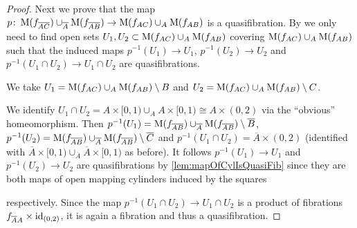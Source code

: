 \begin{prop}
\begin{proof}
        Next we prove that the map $p\colon\operatorname{M}(f_{\overline{A}\overline{C}})\cup_{\overline{A}}\operatorname{M}(f_{\overline{A}\overline{B}})\to\operatorname{M}(f_{AC})\cup_A\operatorname{M}(f_{AB})$ is a quasifibration.
        By \cite[Lemma 4K.3]{hatcher2002algebraic} we only need to find open sets $U_1,U_2\subset\operatorname{M}(f_{AC})\cup_A\operatorname{M}(f_{AB})$ covering $\operatorname{M}(f_{AC})\cup_A\operatorname{M}(f_{AB})$ such that the induced maps $p^{-1}(U_1)\to U_1$, $p^{-1}(U_2)\to U_2$ and $p^{-1}(U_1\cap U_2)\to U_1\cap U_2$ are quasifibrations.

        We take $U_1=\operatorname{M}(f_{AC})\cup_A\operatorname{M}(f_{AB})\setminus{B}$ and $U_2=\operatorname{M}(f_{AC})\cup_A\operatorname{M}(f_{AB})\setminus{C}$. 

        We identify $U_1\cap U_2=A\times [0,1)\cup_A A\times[0,1)\cong A\times (0,2)$ via the ``obvious'' homeomorphism. %
        Then $p^{-1}(U_1)=\operatorname{M}(f_{\overline{A}\overline{B}})\cup_{\overline{A}}\operatorname{M}(f_{\overline{A}\overline{B}})\setminus{\overline{B}}$, $p^{-1}(U_2)=\operatorname{M}(f_{\overline{A}\overline{B}})\cup_{\overline{A}}\operatorname{M}(f_{\overline{A}\overline{B}})\setminus{\overline{C}}$ and $p^{-1}(U_1\cap U_2)=\overline{A}\times (0,2)$ (identified with $\overline{A}\times [0,1)\cup_{\overline{A}} \overline{A}\times[0,1)$ as before).
        It follows $p^{-1}(U_1)\to U_1$ and $p^{-1}(U_2)\to U_2$ are quasifibrations by \cref{lem:mapOfCylIsQuasiFib} since they are both maps of open mapping cylinders induced by the squares 
        \begin{center}
        \end{center}
        respectively.
        Since the map $p^{-1}(U_1\cap U_2)\to U_1\cap U_2$ is a product of fibrations $f_{\overline{A}A}\times\text{id}_{(0,2)}$, it is again a fibration and thus a quasifibration.


\end{proof}
\end{prop}
